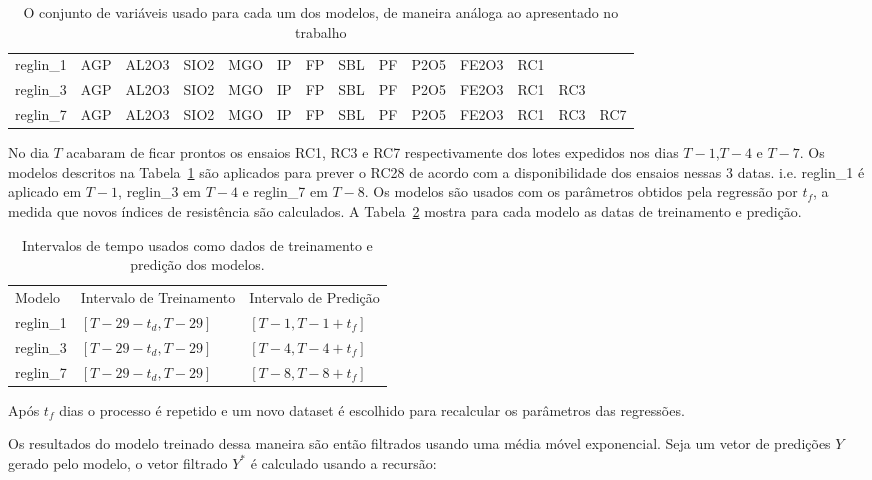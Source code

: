 \begin{table}[]
  \centering 
  \begin{tabular}{llllllllllllll}
    \toprule
    reglin\_1 &  AGP &  AL2O3 &  SIO2 &  MGO &  IP &  FP &  SBL &  PF &  P2O5 &  FE2O3 &  RC1 &      &      \\
    reglin\_3 &  AGP &  AL2O3 &  SIO2 &  MGO &  IP &  FP &  SBL &  PF &  P2O5 &  FE2O3 &  RC1 &  RC3 &      \\
    reglin\_7 &  AGP &  AL2O3 &  SIO2 &  MGO &  IP &  FP &  SBL &  PF &  P2O5 &  FE2O3 &  RC1 &  RC3 &  RC7 \\
    \bottomrule
  \end{tabular}
  \caption{O conjunto de variáveis usado para cada um dos modelos, de maneira análoga ao apresentado no trabalho \cite{grecialin}}
  \label{tab:modelslin}
\end{table}


No dia $T$ acabaram de ficar prontos os ensaios RC1, RC3 e RC7 respectivamente
dos lotes expedidos nos dias $T-1$,$T-4$ e $T-7$. Os modelos descritos na
Tabela~\ref{tab:modelslin} são aplicados para prever o RC28 de acordo com a
disponibilidade dos ensaios nessas 3 datas. i.e. reglin\_1 é aplicado em $T-1$,
reglin\_3 em $T-4$ e reglin\_7 em $T-8$. Os modelos são usados com os parâmetros
obtidos pela regressão por $t_f$, a medida que novos índices de resistência são
calculados. A Tabela~\ref{tab:ranges} mostra para cada modelo as datas de
treinamento e predição.


\begin{table}[]
  \begin{tabular}{lll}
    Modelo    & Intervalo de Treinamento & Intervalo de Predição \\
    reglin\_1 & $[T-29-t_d,T-29]$        & $[T-1, T-1+t_f]$      \\
    reglin\_3 &  $[T-29-t_d,T-29]$       &  $[T-4, T-4+t_f]$      \\
    reglin\_7 &   $[T-29-t_d,T-29]$      &   $[T-8, T-8+t_f]$       
  \end{tabular}
  \caption{Intervalos de tempo usados como dados de treinamento e predição dos modelos.}
  \label{tab:ranges}
\end{table}


Após $t_f$ dias o processo é repetido e um novo dataset é escolhido para
recalcular os parâmetros das regressões.


Os resultados do modelo treinado dessa maneira são então filtrados
usando uma média móvel exponencial. Seja um vetor de predições $Y$ gerado pelo
modelo, o vetor filtrado $Y^*$ é calculado usando a recursão: 


